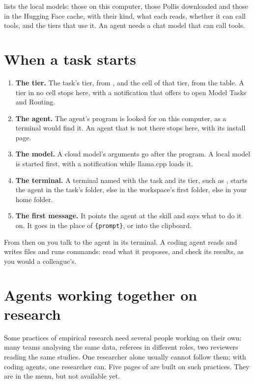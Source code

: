  lists the local models: those on this computer, those
Pollis downloaded and those in the Hugging Face cache, with their kind, what each reads, whether it can call tools, and
the tiers that use it. An agent needs a chat model that can call tools.

\section{When a task starts}\label{sec:start}
\begin{enumerate}
  \item \textbf{The tier.} The task's tier, from , and the cell of that tier, from the table. A tier in no
    cell stops here, with a notification that offers to open Model Tasks and Routing.
  \item \textbf{The agent.} The agent's program is looked for on this computer, as a terminal would find it. An agent
    that is not there stops here, with its install page.
  \item \textbf{The model.} A cloud model's arguments go after the program. A local model is started first, with a
    notification while llama.cpp loads it.
  \item \textbf{The terminal.} A terminal named  with the task and its tier, such as
    , starts the agent in the task's folder, else in the workspace's first
    folder, else in your home folder.
  \item \textbf{The first message.} It points the agent at the skill and says what to do it on. It goes in the place of
    \texttt{\small\{prompt\}}, or into the clipboard.
\end{enumerate}
From then on you talk to the agent in its terminal. A coding agent reads and writes files and runs commands: read what
it proposes, and check its results, as you would a colleague's.

\section{Agents working together on research}\label{sec:research}
Some practices of empirical research need several people working on their own: many teams analysing the same data,
referees in different roles, two reviewers reading the same studies. One researcher alone usually cannot follow them;
with coding agents, one researcher can. Five pages of  are built on such
practices. They are in the menu, but not available yet.

